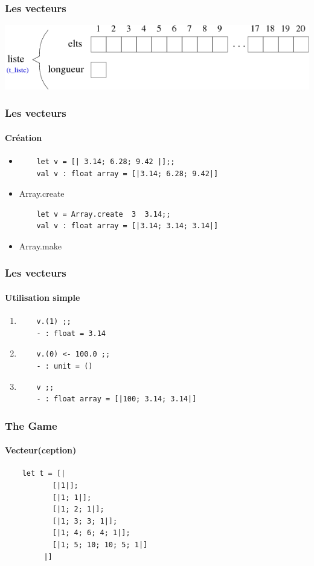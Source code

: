 \begin{frame}
	\frametitle{Les vecteurs}
	\includegraphics[scale=0.5]{pics/vect.png}
\end{frame}

\begin{frame}[fragile]
	\frametitle{Les vecteurs}
	\framesubtitle{Création}
	\begin{itemize}
	\item
	\begin{lstlisting}
	let v = [| 3.14; 6.28; 9.42 |];;
	val v : float array = [|3.14; 6.28; 9.42|]
	\end{lstlisting}

	\item Array.create
	\begin{lstlisting}
	let v = Array.create  3  3.14;;
	val v : float array = [|3.14; 3.14; 3.14|]
	\end{lstlisting}

	\item Array.make
	\end{itemize}
\end{frame}


\begin{frame}[fragile]
	\frametitle{Les vecteurs}
	\framesubtitle{Utilisation simple}
	\begin{enumerate}
	\item
	\begin{lstlisting}
	v.(1) ;;
	- : float = 3.14
	\end{lstlisting}

	\item
	\begin{lstlisting}
	v.(0) <- 100.0 ;;
	- : unit = ()
	\end{lstlisting}

	\item
	\begin{lstlisting}
	v ;;
	- : float array = [|100; 3.14; 3.14|]
	\end{lstlisting}
	\end{enumerate}
\end{frame}

\begin{frame}[fragile]
	\frametitle{The Game}
	\framesubtitle{Vecteur(ception)}
	\begin{lstlisting}
	let t = [| 
           [|1|];
           [|1; 1|];
           [|1; 2; 1|];
           [|1; 3; 3; 1|];
           [|1; 4; 6; 4; 1|];
           [|1; 5; 10; 10; 5; 1|]
         |] 
	\end{lstlisting}
\end{frame}

